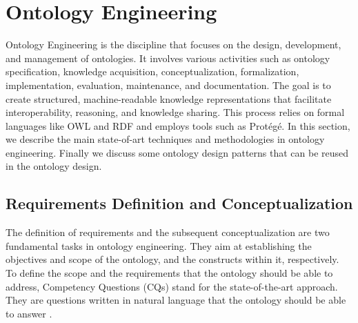 \section{Ontology Engineering}
\label{section:2_2_ontology_engineering}
Ontology Engineering is the discipline that focuses on the design, development, and management of ontologies. It involves various activities such as ontology specification, knowledge acquisition, conceptualization, formalization, implementation, evaluation, maintenance, and documentation. The goal is to create structured, machine-readable knowledge representations that facilitate interoperability, reasoning, and knowledge sharing. This process relies on formal languages like OWL and RDF and employs tools such as Protégé.\cite{falquet2011introduction}
In this section, we describe the main state-of-art techniques and methodologies in ontology engineering. Finally we discuss some ontology design patterns that can be reused in the ontology design.
\subsection{Requirements Definition and Conceptualization}
The definition of requirements and the subsequent conceptualization are two fundamental tasks in ontology engineering.
They aim at establishing the objectives and scope of the ontology, and the constructs within it, respectively.
To define the scope and the requirements that the ontology should be able to address, Competency Questions (CQs) stand for the state-of-the-art approach.
They are questions written in natural language that the ontology should be able to answer \cite{malheiros2013method}.

